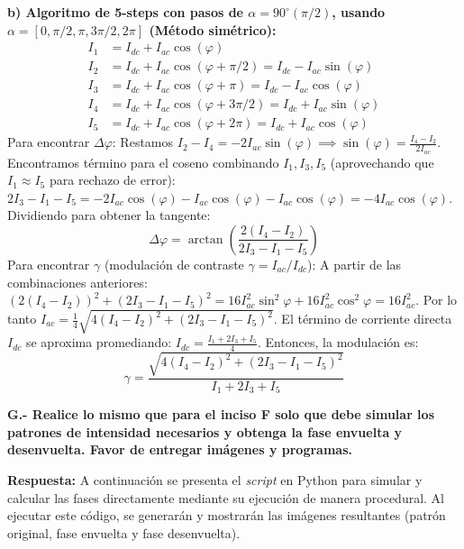\documentclass[12pt,letterpaper]{article}
\begin{document}
	\textbf{b) Algoritmo de 5-steps con pasos de $\alpha=90^\circ (\pi/2)$, usando $\alpha = [0, \pi/2, \pi, 3\pi/2, 2\pi]$ (Método simétrico):}
	\begin{align*}
		I_1 &= I_{dc} + I_{ac}\cos(\varphi) \\
		I_2 &= I_{dc} + I_{ac}\cos(\varphi + \pi/2) = I_{dc} - I_{ac}\sin(\varphi) \\
		I_3 &= I_{dc} + I_{ac}\cos(\varphi + \pi) = I_{dc} - I_{ac}\cos(\varphi) \\
		I_4 &= I_{dc} + I_{ac}\cos(\varphi + 3\pi/2) = I_{dc} + I_{ac}\sin(\varphi) \\
		I_5 &= I_{dc} + I_{ac}\cos(\varphi + 2\pi) = I_{dc} + I_{ac}\cos(\varphi)
	\end{align*}
	Para encontrar $\Delta\varphi$:
	Restamos $I_2 - I_4 = -2I_{ac}\sin(\varphi) \implies \sin(\varphi) = \frac{I_4 - I_2}{2I_{ac}}$.
	Encontramos término para el coseno combinando $I_1, I_3, I_5$ (aprovechando que $I_1 \approx I_5$ para rechazo de error):
	$2I_3 - I_1 - I_5 = -2I_{ac}\cos(\varphi) - I_{ac}\cos(\varphi) - I_{ac}\cos(\varphi) = -4I_{ac}\cos(\varphi)$.
	Dividiendo para obtener la tangente:
	\[
	\Delta\varphi = \arctan\left( \frac{2(I_4 - I_2)}{2I_3 - I_1 - I_5} \right)
	\]
	Para encontrar $\gamma$ (modulación de contraste $\gamma = I_{ac}/I_{dc}$):
	A partir de las combinaciones anteriores:
	$(2(I_4 - I_2))^2 + (2I_3 - I_1 - I_5)^2 = 16I_{ac}^2\sin^2\varphi + 16I_{ac}^2\cos^2\varphi = 16I_{ac}^2$.
	Por lo tanto $I_{ac} = \frac{1}{4}\sqrt{4(I_4 - I_2)^2 + (2I_3 - I_1 - I_5)^2}$.
	El término de corriente directa $I_{dc}$ se aproxima promediando: $I_{dc} = \frac{I_1 + 2I_3 + I_5}{4}$.
	Entonces, la modulación es:
	\[
	\gamma = \frac{\sqrt{4(I_4 - I_2)^2 + (2I_3 - I_1 - I_5)^2}}{I_1 + 2I_3 + I_5}
	\]
	
	\vspace{0.8cm}
	\noindent \textbf{G.- Realice lo mismo que para el inciso F solo que debe simular los patrones de intensidad necesarios y obtenga la fase envuelta y desenvuelta. Favor de entregar imágenes y programas.}
	
	\textbf{Respuesta:}
	A continuación se presenta el \textit{script} en Python para simular y calcular las fases directamente mediante su ejecución de manera procedural. Al ejecutar este código, se generarán y mostrarán las imágenes resultantes (patrón original, fase envuelta y fase desenvuelta).
	
\end{document}
